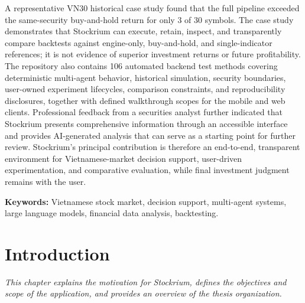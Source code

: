 \documentclass[12pt,a4paper,oneside]{report}
\begin{document}
A representative VN30 historical case study found that the full pipeline exceeded the same-security buy-and-hold return for only 3 of 30 symbols. The case study demonstrates that Stockrium can execute, retain, inspect, and transparently compare backtests against engine-only, buy-and-hold, and single-indicator references; it is not evidence of superior investment returns or future profitability. The repository also contains 106 automated backend test methods covering deterministic multi-agent behavior, historical simulation, security boundaries, user-owned experiment lifecycles, comparison constraints, and reproducibility disclosures, together with defined walkthrough scopes for the mobile and web clients. Professional feedback from a securities analyst further indicated that Stockrium presents comprehensive information through an accessible interface and provides AI-generated analysis that can serve as a starting point for further review. Stockrium's principal contribution is therefore an end-to-end, transparent environment for Vietnamese-market decision support, user-driven experimentation, and comparative evaluation, while final investment judgment remains with the user.

\textbf{Keywords:} Vietnamese stock market, decision support, multi-agent systems, large language models, financial data analysis, backtesting.


\clearpage
{}
\chapter{Introduction}

\textit{This chapter explains the motivation for Stockrium, defines the objectives and scope of the application, and provides an overview of the thesis organization.}








\end{document}
